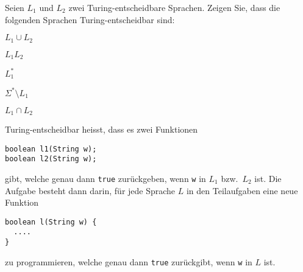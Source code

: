Seien $L_1$ und $L_2$ zwei Turing-entscheidbare Sprachen. Zeigen Sie, dass
die folgenden Sprachen Turing-entscheidbar sind:
\begin{teilaufgaben}
\item $L_1\cup L_2$
\item $L_1L_2$
\item $L_1^*$
\item $\Sigma^*\setminus L_1$
\item $L_1\cap L_2$
\end{teilaufgaben}


\begin{hinweis}
Turing-entscheidbar heisst, dass es zwei Funktionen 
\begin{verbatim}
boolean l1(String w);
boolean l2(String w);
\end{verbatim}
gibt, welche genau dann \texttt{true} zurückgeben, wenn
\texttt{w} in $L_1$ bzw.~$L_2$ ist. Die Aufgabe
besteht dann darin, für jede Sprache $L$ in den Teilaufgaben eine neue
Funktion
\begin{verbatim}
boolean l(String w) {
  ....
}
\end{verbatim}
zu programmieren, welche genau dann \texttt{true} zurückgibt, wenn
\texttt{w} in $L$ ist.
\end{hinweis}


